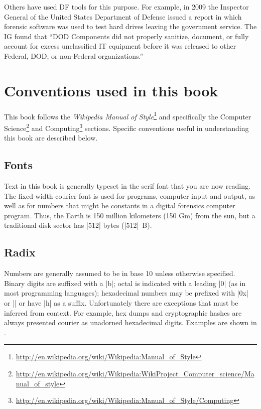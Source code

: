 Others have used DF tools for this purpose. For example, in 2009 the
Inspector General of the United States Department of Defense issued a
report in which forensic software was used to test hard drives leaving
the government service. The IG found that ``DOD Components did not
properly sanitize, document, or fully account for excess unclassified
IT equipment before it was released to other Federal, DOD, or
non-Federal organizations.''\cite{D-2009-104}



\section{Conventions used in this book}
This book follows the \emph{Wikipedia Manual of
  Style}\footnote{\url{http://en.wikipedia.org/wiki/Wikipedia:Manual_of_Style}}
and specifically the Computer
Science\footnote{\url{http://en.wikipedia.org/wiki/Wikipedia:WikiProject_Computer_science/Manual_of_style}}
  and
  Computing\footnote{\url{http://en.wikipedia.org/wiki/Wikipedia:Manual_of_Style/Computing}}
  sections. Specific conventions useful in understanding this book are
  described below.

\subsection{Fonts}

Text in this book is generally typeset in the serif font that you are
now reading. The fixed-width courier font is used for programs,
computer input and output, as well as for numbers that might
be constants in a digital forensics computer program. Thus,
the Earth is 150 million kilometers (150 Gm) from the sun, but a
traditional disk sector has |512| bytes (|512|~B).

\subsection{Radix}
Numbers are generally assumed to be in base 10 unless otherwise
specified. Binary digits are suffixed with a |b|; octal
is indicated with a leading |0| (as in most programming
languages); hexadecimal numbers may be prefixed with |0x| or |\x| or
have |h| as a suffix. Unfortunately there are
exceptions that must be inferred from context. For example, hex dumps
and cryptographic hashes are always presented courier as unadorned hexadecimal
digits. Examples are shown in .

